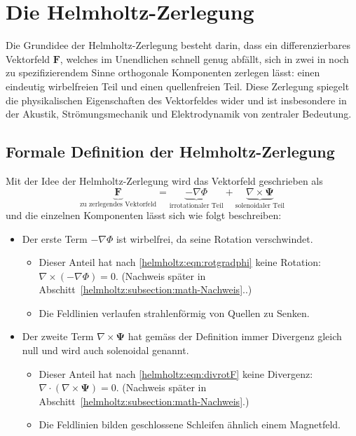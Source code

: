 %
%
%
%
\section{Die Helmholtz-Zerlegung
\label{helmholtz:section:Helmholtz_Zerlegung}}

Die Grundidee der Helmholtz-Zerlegung besteht darin, dass ein
differenzierbares  Vektorfeld $\boldsymbol{F}$, welches im Unendlichen
schnell genug abfällt, sich in zwei in noch zu spezifizierendem
Sinne orthogonale Komponenten zerlegen lässt: einen eindeutig
wirbelfreien Teil und einen quellenfreien Teil.
Diese Zerlegung spiegelt die physikalischen Eigenschaften des
Vektorfeldes wider und ist insbesondere in der Akustik, Strömungsmechanik
%
und Elektrodynamik von zentraler Bedeutung.
%

\subsection{Formale Definition der Helmholtz-Zerlegung
\label{helmholtz:subsection:def_Helmholtz_Zerlegung}}

Mit der Idee der Helmholtz-Zerlegung wird das Vektorfeld geschrieben als
\begin{equation}
\underbrace{
\boldsymbol{F}
}_{
\textstyle\text{zu zerlegendes Vektorfeld}
}
=
\underbrace{
-\nabla \Phi
}_{
\textstyle\text{irrotationaler Teil}
}
+
\underbrace{
\nabla \times \boldsymbol{\Psi}
}_{
\textstyle\text{solenoidaler Teil}
}
\label{helmholtz:equationAllgemein}
\end{equation}
und die einzelnen Komponenten lässt sich wie folgt beschreiben:

\begin{itemize}
\item
Der erste Term $ -\nabla \Phi $ ist wirbelfrei, da seine Rotation verschwindet.
\begin{itemize}
\item
Dieser Anteil hat nach 
\eqref{helmholtz:eqn:rotgradphi}
keine Rotation: $\nabla \times (-\nabla \Phi) = 0$.
(Nachweis später in Abschitt~\ref{helmholtz:subsection:math-Nachweis}..)
\item
Die Feldlinien verlaufen strahlenförmig von Quellen zu Senken.
\end{itemize}

\item
Der zweite Term $\nabla \times \boldsymbol{\Psi}$ hat gemäss der
Definition immer Divergenz gleich null und wird auch solenoidal
genannt.
\begin{itemize}
\item
Dieser Anteil hat nach
\eqref{helmholtz:eqn:divrotF}
keine Divergenz: $\nabla \cdot (\nabla \times
\boldsymbol{\Psi}) = 0$.
(Nachweis später in Abschitt~\ref{helmholtz:subsection:math-Nachweis}.)
\item
Die Feldlinien bilden geschlossene Schleifen ähnlich einem Magnetfeld.
\end{itemize}
\end{itemize}

